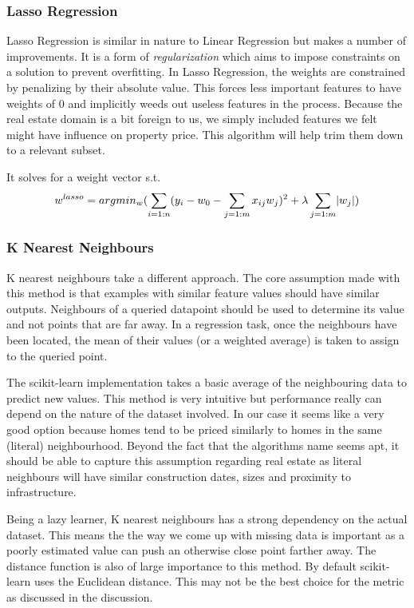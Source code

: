 \documentclass{acm_proc_article-sp}
\DeclarePairedDelimiter{\abs}{\lvert}{\rvert}
\begin{document}
\subsubsection{Lasso Regression}
	Lasso Regression is similar in nature to Linear Regression but makes a number of improvements. It is a form of \emph{regularization} which aims to impose constraints on a solution to prevent overfitting. In Lasso Regression, the weights are constrained by penalizing by their absolute value. This forces less important features to have weights of 0 and implicitly weeds out useless features in the process. Because the real estate domain is a bit foreign to us, we simply included features we felt might have influence on property price. This algorithm will help trim them down to a relevant subset.
	
	It solves for a weight vector s.t. \\
	\[ w^{lasso} = argmin_{w}(\sum_{i=1:n}(y_{i} - w_{0} - \sum_{j=1:m}x_{ij}w_{j})^{2} + \lambda\sum_{j=1:m}\abs{w_{j}}) \]
	
	
\subsubsection{K Nearest Neighbours}
	K nearest neighbours take a different approach. The core assumption made with this method is that examples with similar feature values should have similar outputs. Neighbours of a queried datapoint should be used to determine its value and not points that are far away. In a regression task, once the neighbours have been located, the mean of their values (or a weighted average) is taken to assign to the queried point.
	
	The scikit-learn implementation takes a basic average of the neighbouring data to predict new values. This method is very intuitive but performance really can depend on the nature of the dataset involved. In our case it seems like a very good option because homes tend to be priced similarly to homes in the same (literal) neighbourhood. Beyond the fact that the algorithms name seems apt, it should be able to capture this assumption regarding real estate as literal neighbours will have similar construction dates, sizes and proximity to infrastructure.
	
	Being a lazy learner, K nearest neighbours has a strong dependency on the actual dataset. This means the the way we come up with missing data is important as a poorly estimated value can push an otherwise close point farther away. The distance function is also of large importance to this method. By default scikit-learn uses the Euclidean distance. This may not be the best choice for the metric as discussed in the discussion.
\end{document}
